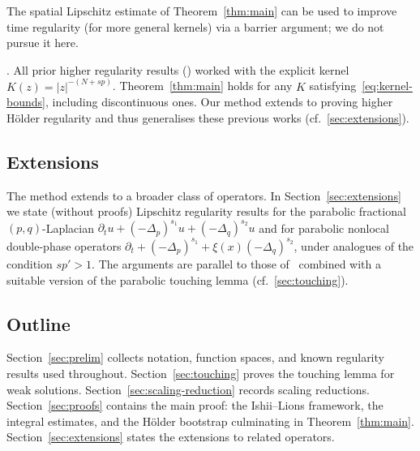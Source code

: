 \documentclass[11pt, a4paper, twoside]{article}
\theoremstyle{definition}
\theoremstyle{remark}
\newcommand*\de{\partial}
\begin{document}
\begin{remark}\label{rem:time-regularity}
  The spatial Lipschitz estimate of Theorem~\ref{thm:main}
  can be used to improve time regularity (for more general kernels) via a barrier
  argument; we do not pursue it here. 
\end{remark}

\begin{remark}
.  All prior higher regularity results
  (\cite{BrascoLindgrenSchikorra2018, GarainLindgren2024,BrascoLindgrenStromqvist2021,
  GarainLindgrenTavakoli2025}) worked with the explicit
  kernel $K(z) = |z|^{-(N+sp)}$.
  Theorem~\ref{thm:main} holds for any $K$
  satisfying~\eqref{eq:kernel-bounds}, including
  discontinuous ones. Our method extends to proving higher H\"older regularity and thus generalises these previous works (cf.~\cref{sec:extensions}).
\end{remark}

\subsection{Extensions}\label{sec:extensions-intro}

The method extends to a broader class of operators. In
Section~\ref{sec:extensions} we state (without proofs)
Lipschitz regularity results for the parabolic fractional
$(p,q)$-Laplacian
$\de_t u + (-\Delta_p)^{s_1}u + (-\Delta_q)^{s_2}u$ and for parabolic nonlocal
double-phase operators
$\de_t + (-\Delta_p)^{s_1} + \xi(x)(-\Delta_q)^{s_2}$, under
analogues of the condition $sp' > 1$. The arguments are
parallel to those of~\cite{BiswasTopp2025} combined with a suitable version of the
parabolic touching lemma (cf.~\cref{sec:touching}).

\subsection{Outline}

Section~\ref{sec:prelim} collects notation, function spaces,
and known regularity results used throughout.
Section~\ref{sec:touching} proves the touching lemma for
weak solutions.
Section~\ref{sec:scaling-reduction} records scaling
reductions. Section~\ref{sec:proofs} contains the main
proof: the Ishii--Lions framework, the integral estimates,
and the H\"{o}lder bootstrap culminating in
Theorem~\ref{thm:main}. Section~\ref{sec:extensions} states
the extensions to related operators.

\end{document}
